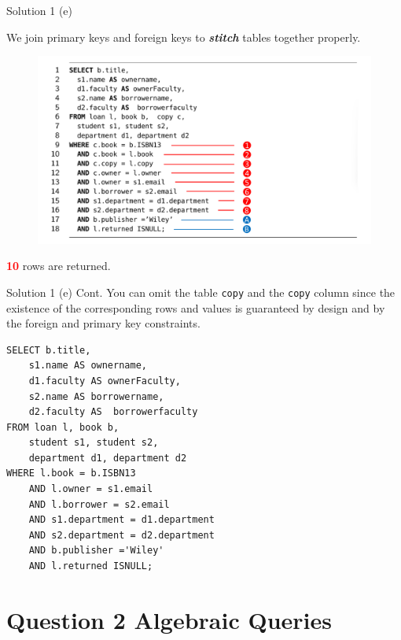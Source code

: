 \begin{frame}[fragile]{Solution 1 (e)}

We join primary keys and foreign keys to \textit{\textbf{stitch}} tables together properly. 
	
\begin{figure}
	\includegraphics[width=1\textwidth]{t2/images/t2-q1e.pdf}
\end{figure}

\textcolor{red}{\textbf{10}} rows are returned.

\end{frame}

\begin{frame}[fragile]{Solution 1 (e) Cont.}
You can omit the table \texttt{copy}  and the \texttt{copy} column since the existence of the corresponding rows and values is guaranteed by design and by the foreign and primary key constraints.
	
\begin{lstlisting}
SELECT b.title, 
	s1.name AS ownername, 
	d1.faculty AS ownerFaculty, 
	s2.name AS borrowername, 
	d2.faculty AS  borrowerfaculty
FROM loan l, book b,  
	student s1, student s2, 
	department d1, department d2
WHERE l.book = b.ISBN13
	AND l.owner = s1.email
	AND l.borrower = s2.email
	AND s1.department = d1.department
	AND s2.department = d2.department
	AND b.publisher ='Wiley'
	AND l.returned ISNULL;
\end{lstlisting}

\end{frame}

\section*{Question 2 Algebraic Queries}

